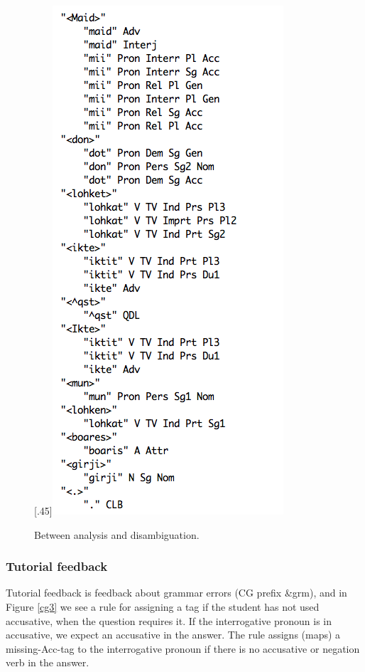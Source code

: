 \documentclass[11pt]{article}
\begin{document}
\begin{figure}[htb]
\begin{center}
\scalebox{.53}[.45]{\includegraphics{presentation/img/iktelohken3.png}}
\caption{Between analysis and disambiguation.}
\label{iktelohken}
\end{center}
\end{figure}

\subsubsection{Tutorial feedback} \label{tutorial}
Tutorial feedback is feedback about grammar errors (CG prefix \&grm), and in Figure \ref{cg3} we see a rule for assigning a tag if the student has not used accusative, when the question requires it. If the interrogative pronoun is in accusative, we expect an accusative in the answer.
The rule assigns (maps) a missing-Acc-tag to the interrogative pronoun if there is no accusative or negation verb in the answer.
\end{document}
